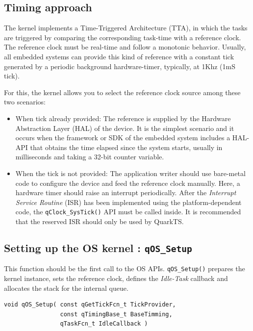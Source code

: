 \documentclass{article}
\begin{document}
\subsection{Timing approach}
The kernel implements a Time-Triggered Architecture (TTA)\cite{pont}, in which the tasks are triggered by comparing the corresponding task-time with a reference clock. The reference clock must be real-time and follow a monotonic behavior. Usually, all embedded systems can provide this kind of reference with a constant tick generated by a periodic background hardware-timer, typically, at 1Khz (1mS tick). 

For this, the kernel allows you to select the reference clock source among these two scenarios:

\begin{itemize}
    \item  When tick already provided: The reference is supplied by the Hardware Abstraction Layer (HAL) of the device.
        It is the simplest scenario and it occurs when the framework or SDK of the embedded system includes a HAL-API that obtains the time elapsed since the system starts, usually in milliseconds and taking a  32-bit counter variable.
    \item When the tick is not provided: The application writer should use bare-metal code to configure the device and feed the reference clock manually.
        Here, a hardware timer should raise an interrupt periodically. After the \textit{Interrupt Service Routine} (ISR) has been implemented using the platform-dependent code, the \lstinline{qClock_SysTick()}  API must be called inside. It is recommended that the reserved ISR should only be used by QuarkTS.
\end{itemize}

\subsection{Setting up the OS kernel : \lstinline{qOS_Setup}} \label{settingupkernel}
 This function should be the first call to the OS APIs. \lstinline{qOS_Setup()}  prepares the kernel instance, sets the reference clock, defines the \textit{Idle-Task} callback and allocates the stack for the internal queue. \\
 
\begin{lstlisting}[style=CStyle]
void qOS_Setup( const qGetTickFcn_t TickProvider, 
                const qTimingBase_t BaseTimming, 
                qTaskFcn_t IdleCallback )
\end{lstlisting}
\end{document}
